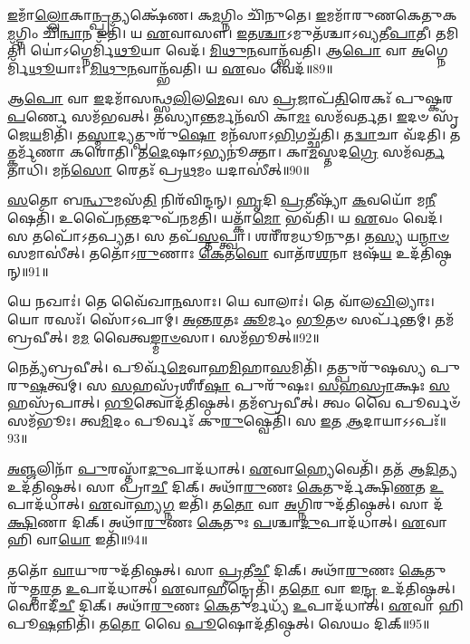 \-\ul{𑌇}\-𑌮𑌾𑌁\-\ul{𑌲𑍍𑌲𑍋}\-𑌕𑌾\-\ul{𑌨𑍍𑌪𑍍𑌰}\-𑌤𑍍𑌯𑌕𑍍𑌷𑍇᳴𑌣। 𑌕\-\ul{𑌮}\-𑌗𑍍𑌨𑌿𑌂 𑌚𑌿᳴𑌨𑍁𑌤𑍇। 
\-\ul{𑌇}\-𑌮𑌮𑌾᳴𑌰𑍁𑌣𑌕𑍇𑌤𑍁𑌕\-\ul{𑌮}\-𑌗𑍍𑌨𑌿𑌂 𑌚𑌿᳴\-\ul{𑌨𑍍𑌵𑌾}\-𑌨 𑌇𑌤𑌿᳴। 𑌯 \ul{𑌏}\-𑌵𑌾𑌸𑍗। 
\-\ul{𑌇}\-𑌤\-\ul{𑌶𑍍𑌚𑌾}\-𑌽𑌮𑍁𑌤᳴𑌶𑍍𑌚𑌾𑌽𑌵𑍍𑌯𑌤𑍀\-\ul{𑌪𑌾}\-𑌤𑍀। 𑌤𑌮𑌿𑌤𑌿᳴। 
𑌯𑍋॑𑌽𑌗𑍍𑌨𑍇𑌰𑍍𑌮𑌿᳴\-\ul{𑌥𑍂}\-𑌯𑌾 𑌵𑍇𑌦᳴। \ul{𑌮𑌿}\-\-\ul{𑌥𑍁}\-\-\ul{𑌨}\-𑌵𑌾𑌨𑍍𑌭᳴𑌵𑌤𑌿। 
𑌆\-\ul{𑌪𑍋} 𑌵𑌾 \ul{𑌅}\-𑌗𑍍𑌨𑍇𑌰𑍍𑌮𑌿᳴\-\ul{𑌥𑍂}\-𑌯𑌾𑌃। \ul{𑌮𑌿}\-\-\ul{𑌥𑍁}\-\-\ul{𑌨}\-𑌵𑌾𑌨𑍍𑌭᳴𑌵𑌤𑌿। 𑌯 \ul{𑌏}\-𑌵𑌂 𑌵𑍇𑌦᳴॥89॥\anuvakamend


𑌆\-\ul{𑌪𑍋} 𑌵𑌾 \ul{𑌇}\-𑌦𑌮𑌾᳴𑌸𑌨𑍍𑌥𑍍𑌸\-\ul{𑌲𑌿}\-𑌲\-\ul{𑌮𑍇}\-𑌵। 𑌸 \ul{𑌪𑍍𑌰}\-𑌜𑌾𑌪᳴\-\ul{𑌤𑌿}\-𑌰𑍇𑌕𑌃᳴ 𑌪𑍁𑌷𑍍𑌕𑌰\-\ul{𑌪}\-𑌰𑍍𑌣𑍇 𑌸𑌮᳴𑌭𑌵𑌤𑍍। 
𑌤𑌸𑍍𑌯𑌾\-\ul{𑌨𑍍𑌤}\-𑌰𑍍𑌮𑌨᳴𑌸𑌿 𑌕𑌾\-\ul{𑌮𑌃} 𑌸𑌮᳴𑌵𑌰𑍍𑌤𑌤। \ul{𑌇}\-𑌦𑍞 𑌸𑍃᳴𑌜𑍇\-\ul{𑌯}\-𑌮𑌿𑌤𑌿᳴। 
𑌤\-\ul{𑌸𑍍𑌮𑌾}\-𑌦𑍍𑌯𑌤𑍍𑌪𑍁𑌰𑍁᳴\-\ul{𑌷𑍋} 𑌮𑌨᳴𑌸𑌾𑌽\-\ul{𑌭𑌿}\-𑌗𑌚𑍍𑌛᳴𑌤𑌿। 𑌤\-\ul{𑌦𑍍𑌵𑌾}\-𑌚𑌾 𑌵᳴𑌦𑌤𑌿। 
𑌤𑌤𑍍𑌕𑌰𑍍𑌮᳴𑌣𑌾 𑌕𑌰𑍋𑌤𑌿। 𑌤\-\ul{𑌦𑍇}\-𑌷𑌾𑌽𑌭𑍍𑌯𑌨𑍂॑𑌕𑍍𑌤𑌾। 
𑌕𑌾\-\ul{𑌮}\-𑌸𑍍𑌤𑌦\-\ul{𑌗𑍍𑌰𑍇} 𑌸𑌮᳴𑌵\-\ul{𑌰𑍍𑌤}\-𑌤𑌾𑌧𑌿᳴। 𑌮𑌨᳴\-\ul{𑌸𑍋} 𑌰𑍇𑌤𑌃᳴ 𑌪𑍍𑌰\-\ul{𑌥}\-𑌮𑌂 𑌯𑌦𑌾𑌸𑍀॑𑌤𑍍॥90॥


\-\ul{𑌸}\-𑌤𑍋 𑌬\-\ul{𑌨𑍍𑌧𑍁}\-𑌮𑌸᳴\-\ul{𑌤𑌿} 𑌨𑌿𑌰᳴𑌵𑌿𑌨𑍍𑌦𑌨𑍍। \ul{𑌹𑍃}\-𑌦𑌿 \ul{𑌪𑍍𑌰}\-𑌤𑍀𑌷𑍍𑌯𑌾᳴ \ul{𑌕}\-𑌵𑌯𑍋᳴ 𑌮\-\ul{𑌨𑍀}\-𑌷𑍇𑌤𑌿᳴। 
𑌉𑌪𑍈᳴\-\ul{𑌨}\-𑌨𑍍𑌤𑌦𑍁𑌪᳴𑌨𑌮𑌤𑌿। 𑌯𑌤𑍍𑌕𑌾᳴\-\ul{𑌮𑍋} 𑌭𑌵᳴𑌤𑌿। 𑌯 \ul{𑌏}\-𑌵𑌂 𑌵𑍇𑌦᳴। 
𑌸 𑌤𑌪𑍋᳴𑌽𑌤𑌪𑍍𑌯𑌤। 𑌸 𑌤𑌪᳴\-\ul{𑌸𑍍𑌤}\-𑌪𑍍𑌤𑍍𑌵𑌾। 𑌶𑌰𑍀᳴𑌰𑌮𑌧𑍂𑌨𑍁𑌤। 𑌤\-\ul{𑌸𑍍𑌯} 𑌯\-\ul{𑌨𑍍𑌮𑌾}\-\-\ul{𑍞}\-𑌸𑌮𑌾𑌸𑍀॑𑌤𑍍। 
𑌤𑌤𑍋᳴𑌽\-\ul{𑌰𑍁}\-𑌣𑌾𑌃 \ul{𑌕𑍇}\-𑌤\-\ul{𑌵𑍋} 𑌵𑌾𑌤᳴𑌰\-\ul{𑌶}\-𑌨𑌾 𑌋𑌷᳴\-\ul{𑌯} 𑌉𑌦᳴𑌤𑌿𑌷𑍍𑌠𑌨𑍍॥91॥


𑌯𑍇 𑌨𑌖𑌾𑌃॑। 𑌤𑍇 𑌵𑍈᳴𑌖𑌾\-\ul{𑌨}\-𑌸𑌾𑌃। 𑌯𑍇 𑌵𑌾𑌲𑌾𑌃॑। 𑌤𑍇 𑌵𑌾᳴𑌲\-\ul{𑌖𑌿}\-𑌲𑍍𑌯𑌾𑌃। 
𑌯𑍋 𑌰𑌸𑌃᳴। 𑌸𑍋᳴𑌽𑌪𑌾𑌮𑍍। \ul{𑌅}\-\-\ul{𑌨𑍍𑌤}\-\-\ul{𑌰}\-𑌤𑌃 \ul{𑌕𑍂}\-𑌰𑍍𑌮𑌂 \ul{𑌭𑍂}\-𑌤𑍞 𑌸𑌰𑍍𑌪᳴𑌨𑍍𑌤𑌮𑍍। 
𑌤𑌮᳴𑌬𑍍𑌰𑌵𑍀𑌤𑍍। 𑌮\-\ul{𑌮} 𑌵𑍈𑌤𑍍𑌵\-\ul{𑌙𑍍𑌮𑌾}\-\-\ul{𑍞}\-𑌸𑌾। 𑌸𑌮᳴𑌭𑍂𑌤𑍍॥92॥


𑌨𑍇𑌤𑍍𑌯᳴𑌬𑍍𑌰𑌵𑍀𑌤𑍍। 𑌪𑍂𑌰𑍍𑌵᳴\-\ul{𑌮𑍇}\-𑌵𑌾𑌹\-\ul{𑌮𑌿}\-𑌹𑌾\-\ul{𑌸}\-𑌮𑌿𑌤𑌿᳴। 
𑌤𑌤𑍍𑌪𑍁𑌰𑍁᳴𑌷𑌸𑍍𑌯 𑌪𑍁𑌰𑍁\-\ul{𑌷}\-𑌤𑍍𑌵𑌮𑍍। 𑌸 \ul{𑌸}\-𑌹𑌸𑍍𑌰᳴𑌶𑍀𑌰𑍍‌\-\ul{𑌷𑌾} 𑌪𑍁𑌰𑍁᳴𑌷𑌃। 
\-\ul{𑌸}\-\-\ul{𑌹}\-\-\ul{𑌸𑍍𑌰𑌾}\-𑌕𑍍𑌷𑌃 \ul{𑌸}\-𑌹𑌸𑍍𑌰᳴𑌪𑌾𑌤𑍍। \ul{𑌭𑍂}\-𑌤𑍍𑌵𑍋𑌦᳴𑌤𑌿𑌷𑍍𑌠𑌤𑍍। 
𑌤𑌮᳴𑌬𑍍𑌰𑌵𑍀𑌤𑍍। 𑌤𑍍𑌵𑌂 𑌵𑍈 𑌪𑍂𑌰𑍍𑌵𑍞᳴ 𑌸𑌮᳴𑌭𑍂𑌃। 
𑌤𑍍𑌵\-\ul{𑌮𑌿}\-𑌦𑌂 𑌪𑍂𑌰𑍍𑌵𑌃᳴ 𑌕𑍁\-\ul{𑌰𑍁}\-𑌷𑍍𑌵𑍇𑌤𑌿᳴। 𑌸 \ul{𑌇}\-𑌤 \ul{𑌆}\-𑌦𑌾𑌯𑌾𑌽𑌽𑌪𑌃᳴॥93॥


\-\ul{𑌅}\-\-\ul{𑌞𑍍𑌜}\-𑌲𑌿𑌨𑌾᳴ \ul{𑌪𑍁}\-𑌰𑌸𑍍𑌤𑌾᳴\-\ul{𑌦𑍁}\-𑌪𑌾𑌦᳴𑌧𑌾𑌤𑍍। \ul{𑌏}\-𑌵𑌾\-\ul{𑌹𑍍𑌯𑍇}\-𑌵𑍇𑌤𑌿᳴। 
𑌤𑌤᳴ 𑌆\-\ul{𑌦𑌿}\-𑌤𑍍𑌯 𑌉𑌦᳴𑌤𑌿𑌷𑍍𑌠𑌤𑍍। 𑌸𑌾 𑌪𑍍𑌰𑌾\-\ul{𑌚𑍀} 𑌦𑌿𑌕𑍍। 
𑌅𑌥𑌾᳴\-\ul{𑌰𑍁}\-𑌣𑌃 \ul{𑌕𑍇}\-𑌤𑍁𑌰𑍍𑌦᳴𑌕𑍍𑌷𑌿\-\ul{𑌣}\-𑌤 \ul{𑌉}\-𑌪𑌾𑌦᳴𑌧𑌾𑌤𑍍। 
\-\ul{𑌏}\-𑌵𑌾𑌹𑍍𑌯\-\ul{𑌗𑍍𑌨} 𑌇𑌤𑌿᳴। 𑌤\-\ul{𑌤𑍋} 𑌵𑌾 \ul{𑌅}\-𑌗𑍍𑌨𑌿𑌰𑍁𑌦᳴𑌤𑌿𑌷𑍍𑌠𑌤𑍍। 
𑌸𑌾 𑌦᳴\-\ul{𑌕𑍍𑌷𑌿}\-𑌣𑌾 𑌦𑌿𑌕𑍍। 𑌅𑌥𑌾᳴\-\ul{𑌰𑍁}\-𑌣𑌃 \ul{𑌕𑍇}\-𑌤𑍁𑌃 \ul{𑌪}\-𑌶𑍍𑌚𑌾\-\ul{𑌦𑍁}\-𑌪𑌾𑌦᳴𑌧𑌾𑌤𑍍। 
\-\ul{𑌏}\-𑌵𑌾 𑌹𑌿 𑌵𑌾\-\ul{𑌯𑍋} 𑌇𑌤𑌿᳴॥94॥


𑌤𑌤𑍋᳴ \ul{𑌵𑌾}\-𑌯𑍁𑌰𑍁𑌦᳴𑌤𑌿𑌷𑍍𑌠𑌤𑍍। 𑌸𑌾 \ul{𑌪𑍍𑌰}\-𑌤𑍀\-\ul{𑌚𑍀} 𑌦𑌿𑌕𑍍। 
𑌅𑌥𑌾᳴\-\ul{𑌰𑍁}\-𑌣𑌃 \ul{𑌕𑍇}\-𑌤𑍁𑌰𑍁᳴𑌤𑍍𑌤\-\ul{𑌰}\-𑌤 \ul{𑌉}\-𑌪𑌾𑌦᳴𑌧𑌾𑌤𑍍। \ul{𑌏}\-𑌵𑌾𑌹𑍀𑌨𑍍𑌦𑍍𑌰𑍇𑌤𑌿᳴। 
𑌤\-\ul{𑌤𑍋} 𑌵𑌾 𑌇\-\ul{𑌨𑍍𑌦𑍍𑌰} 𑌉𑌦᳴𑌤𑌿𑌷𑍍𑌠𑌤𑍍। 𑌸𑍋𑌦𑍀᳴\-\ul{𑌚𑍀} 𑌦𑌿𑌕𑍍। 
𑌅𑌥𑌾᳴\-\ul{𑌰𑍁}\-𑌣𑌃 \ul{𑌕𑍇}\-𑌤𑍁𑌰𑍍𑌮𑌧𑍍𑌯᳴ \ul{𑌉}\-𑌪𑌾𑌦᳴𑌧𑌾𑌤𑍍। \ul{𑌏}\-𑌵𑌾 𑌹𑌿 𑌪𑍂\-\ul{𑌷}\-𑌨𑍍𑌨𑌿𑌤𑌿᳴। 
𑌤\-\ul{𑌤𑍋} 𑌵𑍈 \ul{𑌪𑍂}\-𑌷𑍋𑌦᳴𑌤𑌿𑌷𑍍𑌠𑌤𑍍। 𑌸𑍇𑌯𑌂 𑌦𑌿𑌕𑍍॥95॥


